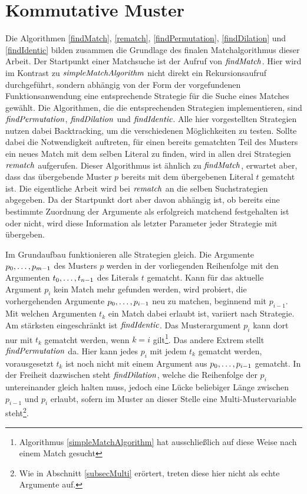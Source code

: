 \section{Kommutative Muster} \label{subsecACMuster}

Die Algorithmen \ref{findMatch}, \ref{rematch}, \ref{findPermutation}, \ref{findDilation} und \ref{findIdentic} bilden zusammen die Grundlage des finalen Matchalgorithmus dieser Arbeit. Der Startpunkt einer Matchsuche ist der Aufruf von $\mathit{findMatch}$. Hier wird im Kontrast zu $\mathit{simpleMatchAlgorithm}$ nicht direkt ein Rekursionsaufruf durchgeführt, sondern abhängig von der Form der vorgefundenen Funktionsanwendung eine entsprechende Strategie für die Suche eines Matches gewählt. Die Algorithmen, die die entsprechenden Strategien implementieren, sind $\mathit{findPermutation}$, $\mathit{findDilation}$ und $\mathit{findIdentic}$. Alle hier vorgestellten Strategien nutzen dabei Backtracking, um die verschiedenen Möglichkeiten zu testen. Sollte dabei die Notwendigkeit auftreten, für einen bereits gematchten Teil des Musters ein neues Match mit dem selben Literal zu finden, wird in allen drei Strategien $\mathit{rematch}$ aufgerufen. Dieser Algorithmus ist ähnlich zu $\mathit{findMatch}$, erwartet aber, dass das übergebende Muster $p$ bereits mit dem übergebenen Literal $t$ gematcht ist. Die eigentliche Arbeit wird bei $\mathit{rematch}$ an die selben Suchstrategien abgegeben. Da der Startpunkt dort aber davon abhängig ist, ob bereits eine bestimmte Zuordnung der Argumente als erfolgreich matchend festgehalten ist oder nicht, wird diese Information als letzter Parameter jeder Strategie mit übergeben.


Im Grundaufbau funktionieren alle Strategien gleich. Die Argumente ${p}_{0}, \dots, {p}_{m-1}$ des Musters $p$ werden in der vorliegenden Reihenfolge mit den Argumenten ${t}_{0}, \dots, {t}_{n-1}$ des Literals $t$ gematcht. Kann für das aktuelle Argument $p_i$ kein Match mehr gefunden werden, wird probiert, die vorhergehenden Argumente ${p}_{0}, \dots, {p}_{i-1}$ neu zu matchen, beginnend mit $p_{i-1}$. Mit welchen Argumenten $t_k$ ein Match dabei erlaubt ist, variiert nach Strategie. Am stärksten eingeschränkt ist $\mathit{findIdentic}$. Das Musterargument $p_i$ kann dort nur mit $t_k$ gematcht werden, wenn $k = i$ gilt\footnote{Algorithmus \ref{simpleMatchAlgorithm} hat ausschließlich auf diese Weise nach einem Match gesucht}. Das andere Extrem stellt $\mathit{findPermutation}$ da. Hier kann jedes $p_i$ mit jedem $t_k$ gematcht werden, vorausgesetzt $t_k$ ist noch nicht mit einem Argument aus ${p}_{0}, \dots, {p}_{i-1}$ gematcht. In der Freiheit dazwischen steht $\mathit{findDilation}$, welche die Reihenfolge der $p_i$ untereinander gleich halten muss, jedoch eine Lücke beliebiger Länge zwischen $p_{i-1}$ und $p_i$ erlaubt, sofern im Muster an dieser Stelle eine Multi-Mustervariable steht\footnote{Wie in Abschnitt \ref{subsecMulti} erörtert, treten diese hier nicht als echte Argumente auf.}.

